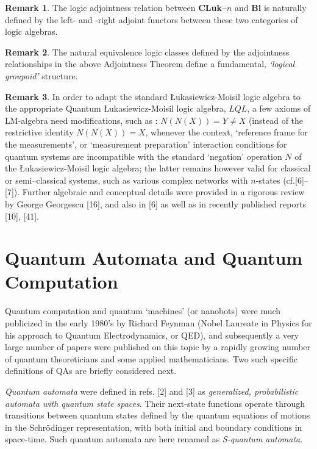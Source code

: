 \documentclass[12pt]{article}
\theoremstyle{plain}
\theoremstyle{definition}
\newtheorem{remark}{Remark}[section]
\numberwithin{equation}{section}
\begin{document}
\begin{remark}
The logic adjointness relation between \textbf{CLuk--$n$} and \textbf{Bl} is naturally defined by the left- and -right adjoint
functors between these two categories of logic algebras.
\end{remark}

\begin{remark}
The natural equivalence logic classes defined by the
adjointness relationships in the above Adjointness Theorem define
a fundamental, \emph{`logical groupoid'} structure.
\end{remark}

\begin{remark}
In order to adapt the standard \L{}ukasiewicz-Moisil logic algebra to
the appropriate Quantum \L{}ukasiewicz-Moisil logic algebra,
\textbf{$LQL$}, a few axioms of LM-algebra need modifications, such as : $N(N(X)) = Y \neq  X  $ (instead of the restrictive identity $N(N(X)) = X$,  whenever the context, `reference frame for the measurements', or  `measurement preparation' interaction conditions
for quantum systems are incompatible with the standard `negation'
operation $N$ of the \L{}ukasiewicz-Moisil logic algebra; the latter remains however valid for classical or semi--classical systems, such as various complex networks with  $n$-states (cf.[6]-- [7]). Further algebraic and conceptual details were provided in a rigorous review by George Georgescu [16], and also in  [6] as well as in recently published reports [10], [41].
\end{remark}

\section{Quantum Automata and Quantum Computation}


Quantum computation and quantum `machines' (or nanobots) were much publicized in the early 1980's by Richard Feynman (Nobel Laureate in Physics for his approach to Quantum Electrodynamics, or QED), and subsequently a very large number of papers were published on this topic by a rapidly growing number of quantum theoreticians and some applied mathematicians. Two such specific definitions of QAs are briefly considered next.

\emph{Quantum automata} were defined in refs. [2] and [3] as \emph{generalized, probabilistic automata with quantum state spaces}. Their next-state functions operate
 through transitions between quantum states defined by the quantum equations of motions in the Schr\"{o}dinger representation, with both initial and 
boundary conditions in space-time. Such quantum automata are here renamed as \emph{S-quantum automata}.
\end{document}

